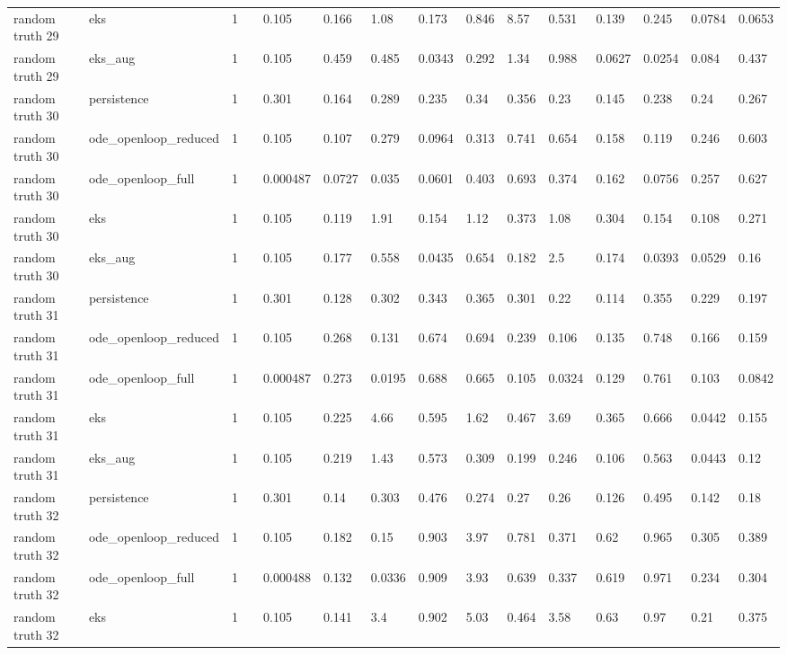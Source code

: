 \begin{table}[t]
\begin{tabular}{lllllllllllllll}
random truth 29 & eks & 1 &  & 0.105 & 0.166 & 1.08 & 0.173 & 0.846 & 8.57 & 0.531 & 0.139 & 0.245 & 0.0784 & 0.0653 \\
random truth 29 & eks\_aug & 1 &  & 0.105 & 0.459 & 0.485 & 0.0343 & 0.292 & 1.34 & 0.988 & 0.0627 & 0.0254 & 0.084 & 0.437 \\
random truth 30 & persistence & 1 &  & 0.301 & 0.164 & 0.289 & 0.235 & 0.34 & 0.356 & 0.23 & 0.145 & 0.238 & 0.24 & 0.267 \\
random truth 30 & ode\_openloop\_reduced & 1 &  & 0.105 & 0.107 & 0.279 & 0.0964 & 0.313 & 0.741 & 0.654 & 0.158 & 0.119 & 0.246 & 0.603 \\
random truth 30 & ode\_openloop\_full & 1 &  & 0.000487 & 0.0727 & 0.035 & 0.0601 & 0.403 & 0.693 & 0.374 & 0.162 & 0.0756 & 0.257 & 0.627 \\
random truth 30 & eks & 1 &  & 0.105 & 0.119 & 1.91 & 0.154 & 1.12 & 0.373 & 1.08 & 0.304 & 0.154 & 0.108 & 0.271 \\
random truth 30 & eks\_aug & 1 &  & 0.105 & 0.177 & 0.558 & 0.0435 & 0.654 & 0.182 & 2.5 & 0.174 & 0.0393 & 0.0529 & 0.16 \\
random truth 31 & persistence & 1 &  & 0.301 & 0.128 & 0.302 & 0.343 & 0.365 & 0.301 & 0.22 & 0.114 & 0.355 & 0.229 & 0.197 \\
random truth 31 & ode\_openloop\_reduced & 1 &  & 0.105 & 0.268 & 0.131 & 0.674 & 0.694 & 0.239 & 0.106 & 0.135 & 0.748 & 0.166 & 0.159 \\
random truth 31 & ode\_openloop\_full & 1 &  & 0.000487 & 0.273 & 0.0195 & 0.688 & 0.665 & 0.105 & 0.0324 & 0.129 & 0.761 & 0.103 & 0.0842 \\
random truth 31 & eks & 1 &  & 0.105 & 0.225 & 4.66 & 0.595 & 1.62 & 0.467 & 3.69 & 0.365 & 0.666 & 0.0442 & 0.155 \\
random truth 31 & eks\_aug & 1 &  & 0.105 & 0.219 & 1.43 & 0.573 & 0.309 & 0.199 & 0.246 & 0.106 & 0.563 & 0.0443 & 0.12 \\
random truth 32 & persistence & 1 &  & 0.301 & 0.14 & 0.303 & 0.476 & 0.274 & 0.27 & 0.26 & 0.126 & 0.495 & 0.142 & 0.18 \\
random truth 32 & ode\_openloop\_reduced & 1 &  & 0.105 & 0.182 & 0.15 & 0.903 & 3.97 & 0.781 & 0.371 & 0.62 & 0.965 & 0.305 & 0.389 \\
random truth 32 & ode\_openloop\_full & 1 &  & 0.000488 & 0.132 & 0.0336 & 0.909 & 3.93 & 0.639 & 0.337 & 0.619 & 0.971 & 0.234 & 0.304 \\
random truth 32 & eks & 1 &  & 0.105 & 0.141 & 3.4 & 0.902 & 5.03 & 0.464 & 3.58 & 0.63 & 0.97 & 0.21 & 0.375 \\

\end{tabular}
\end{table}

